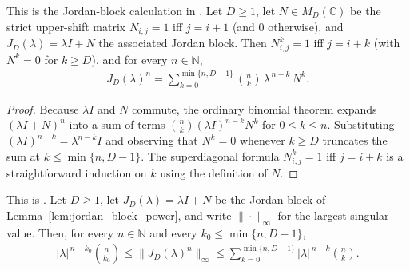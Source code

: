 %
\begin{lemma}
    \label{lem:jordan_block_power}
    \leanok
    This is the Jordan-block calculation in
    \cite[Chapter~8, proof of Equation~(8.104)]{Wolf2012Quantum}.
    Let $D\ge 1$, let $N\in M_{D}(\mathbb C)$ be the strict upper-shift matrix
    $N_{i,j}=1$ iff $j=i+1$ (and $0$ otherwise), and
    $J_{D}(\lambda)=\lambda I+N$ the associated Jordan block.
    Then $N^{k}_{i,j}=1$ iff $j=i+k$ (with $N^{k}=0$ for $k\ge D$), and for
    every $n\in\mathbb N$,
    \begin{align}
    J_{D}(\lambda)^{n}
      =\sum_{k=0}^{\min\{n,D-1\}}
        \binom{n}{k}\,\lambda^{\,n-k}\,N^{k}.
    \end{align}
\end{lemma}

\begin{proof}
  \leanok
  Because $\lambda I$ and $N$ commute, the ordinary binomial theorem expands
  $(\lambda I+N)^{n}$ into a sum of terms $\binom{n}{k}(\lambda I)^{n-k}N^{k}$
  for $0\le k\le n$.  Substituting $(\lambda I)^{n-k}=\lambda^{n-k}I$ and
  observing that $N^{k}=0$ whenever $k\ge D$ truncates the sum at
  $k\le\min\{n,D-1\}$.  The superdiagonal formula $N^{k}_{i,j}=1$ iff $j=i+k$
  is a straightforward induction on $k$ using the definition of $N$.
\end{proof}

%
\begin{theorem}
    \label{thm:jordan_block_power_norm}
    \leanok
    This is \cite[Chapter~8, Equation~(8.104)]{Wolf2012Quantum}.
    Let $D\ge 1$, let $J_{D}(\lambda)=\lambda I+N$ be the Jordan block of
    Lemma~\ref{lem:jordan_block_power}, and write $\|\cdot\|_{\infty}$ for the
    largest singular value.  Then, for every $n\in\mathbb N$ and every
    $k_{0}\le\min\{n,D-1\}$,
    \begin{align}
      |\lambda|^{\,n-k_{0}}\binom{n}{k_{0}}
      \le\bigl\|J_{D}(\lambda)^{n}\bigr\|_{\infty}
      \le\sum_{k=0}^{\min\{n,D-1\}}|\lambda|^{\,n-k}\binom{n}{k}.
    \end{align}
\end{theorem}

